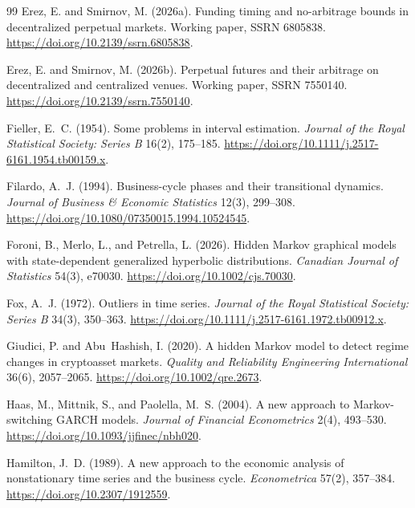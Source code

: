 \documentclass[10pt,a4paper]{article}
\begin{document}
\begin{thebibliography}{99}
Erez, E. and Smirnov, M. (2026a).
\newblock Funding timing and no-arbitrage bounds in decentralized perpetual markets.
\newblock Working paper, SSRN 6805838.
\newblock \url{https://doi.org/10.2139/ssrn.6805838}.

Erez, E. and Smirnov, M. (2026b).
\newblock Perpetual futures and their arbitrage on decentralized and centralized venues.
\newblock Working paper, SSRN 7550140.
\newblock \url{https://doi.org/10.2139/ssrn.7550140}.

Fieller, E.~C. (1954).
\newblock Some problems in interval estimation.
\newblock \textit{Journal of the Royal Statistical Society: Series B} 16(2), 175--185.
\newblock \url{https://doi.org/10.1111/j.2517-6161.1954.tb00159.x}.

Filardo, A.~J. (1994).
\newblock Business-cycle phases and their transitional dynamics.
\newblock \textit{Journal of Business \& Economic Statistics} 12(3), 299--308.
\newblock \url{https://doi.org/10.1080/07350015.1994.10524545}.

Foroni, B., Merlo, L., and Petrella, L. (2026).
\newblock Hidden Markov graphical models with state-dependent generalized hyperbolic distributions.
\newblock \textit{Canadian Journal of Statistics} 54(3), e70030.
\newblock \url{https://doi.org/10.1002/cjs.70030}.

Fox, A.~J. (1972).
\newblock Outliers in time series.
\newblock \textit{Journal of the Royal Statistical Society: Series B} 34(3), 350--363.
\newblock \url{https://doi.org/10.1111/j.2517-6161.1972.tb00912.x}.

Giudici, P. and Abu~Hashish, I. (2020).
\newblock A hidden Markov model to detect regime changes in cryptoasset markets.
\newblock \textit{Quality and Reliability Engineering International} 36(6), 2057--2065.
\newblock \url{https://doi.org/10.1002/qre.2673}.

Haas, M., Mittnik, S., and Paolella, M.~S. (2004).
\newblock A new approach to Markov-switching GARCH models.
\newblock \textit{Journal of Financial Econometrics} 2(4), 493--530.
\newblock \url{https://doi.org/10.1093/jjfinec/nbh020}.

Hamilton, J.~D. (1989).
\newblock A new approach to the economic analysis of nonstationary time series and the business cycle.
\newblock \textit{Econometrica} 57(2), 357--384.
\newblock \url{https://doi.org/10.2307/1912559}.


\end{thebibliography}
\end{document}
